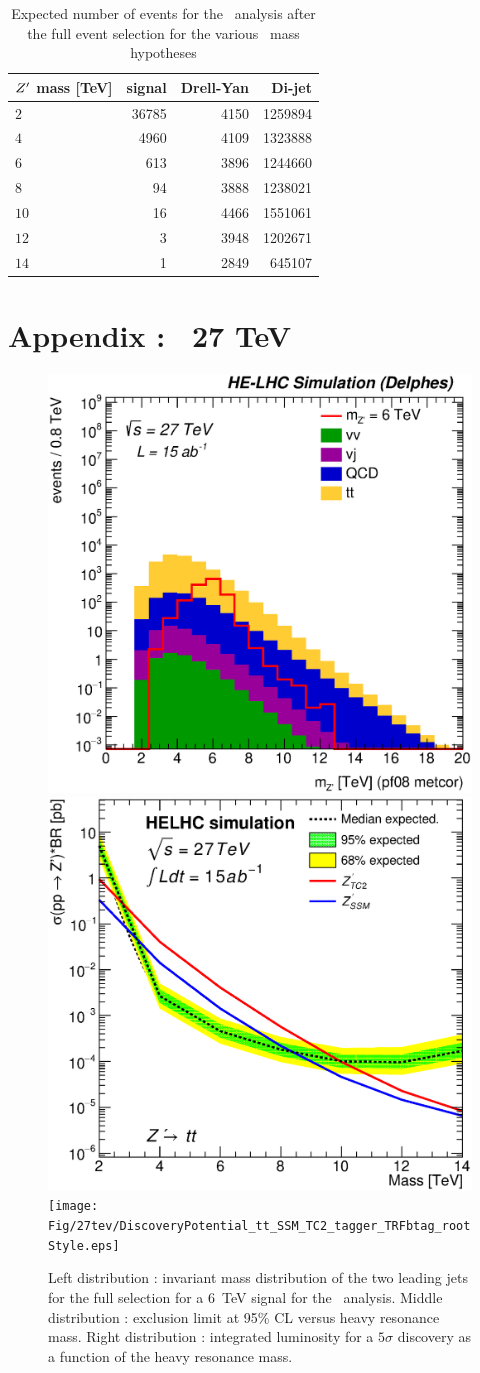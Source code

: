 \begin{table}[!htb]
   \centering
\begin{tabular}{|l|r|r|r|}
  \hline
  \hline
$Z^{\prime}$ mass [TeV]  & signal &  Drell-Yan & Di-jet \\
  \hline
  $2$  & 36785 & 4150 & 1259894 \\
  $4$  &  4960 & 4109 & 1323888 \\
  $6$  &   613 & 3896 & 1244660 \\
  $8$  &    94 & 3888 & 1238021 \\
  $10$ &    16 & 4466 & 1551061 \\
  $12$ &     3 & 3948 & 1202671 \\
  $14$ &     1 & 2849 &  645107 \\
  \hline
  \hline
\end{tabular}
  \caption{Expected number of events for the \Zptata\ analysis after the full event selection for the various \Zp\ mass hypotheses}
  \label{tab:leptonicresonances27:yieldstautau}
\end{table}

\clearpage
\newpage

\section{Appendix : \zptt\ 27 TeV}
\label{appendix:zptt27}

\begin{figure}[!htb]
  \centering
  \includegraphics[width=0.30\columnwidth]{Fig/27tev/Zptt_Mj1j2_pf08_MetCorr_fit_sel8_nostack_log.eps}
  \includegraphics[width=0.30\columnwidth]{Fig/27tev/lim_Zprime_tt_helhc_v01.eps}
  \texttt{[image: Fig/27tev/DiscoveryPotential\_tt\_SSM\_TC2\_tagger\_TRFbtag\_rootStyle.eps]}
  \caption{Left distribution : invariant mass distribution of the two leading jets for the full selection for a 6~TeV signal for the \zptt\ analysis. Middle distribution : exclusion limit at 95\% CL versus heavy resonance mass. Right distribution : integrated luminosity for a $5\sigma$ discovery as a function of the heavy resonance mass.}
  \label{figure:hadronicresonances27:ttsel08}
\end{figure}

